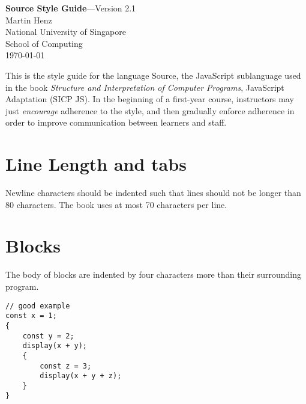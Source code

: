 

\usepackage{CJKutf8}

\parindent=20pt


  \thispagestyle{empty}
  
\begin{center}
  {\Large {\bf Source Style Guide}---Version 2.1}\\[10mm]

  {\large Martin Henz}\\[5mm]

  {\large National University of Singapore \\
          School of Computing}\\[10mm]

  {\large \today}\\[10mm]
\end{center}
\noindent
This is the style guide for the language Source,
the JavaScript sublanguage used in the book \emph{Structure and Interpretation
of Computer Programs}, JavaScript Adaptation (SICP JS). 
In the beginning of a first-year course, instructors may just \emph{encourage}
adherence to the style, and then gradually enforce adherence in order to
improve communication between learners and staff.

\section*{Line Length and tabs}
  Newline characters should be indented such that lines
  should not be longer than 80 characters. The book uses at most
  70 characters per line.

\section*{Blocks}

The body of blocks are indented by four characters more than their surrounding program.
\begin{lstlisting}
// good example
const x = 1;
{
    const y = 2;
    display(x + y);
    {
        const z = 3;
        display(x + y + z);
    }
}
\end{lstlisting}

\vspace{-4mm}

